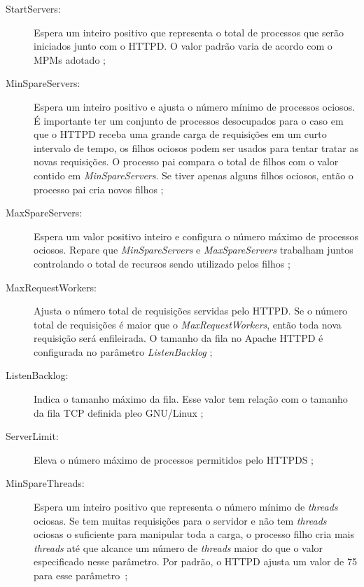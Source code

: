 \begin{description}
  \item [StartServers:]
Espera um inteiro positivo que representa o total de processos que serão
iniciados junto com o HTTPD.  O valor padrão varia de acordo com o MPMs adotado
\citep{mpm_start_server};

  \item [MinSpareServers:]
Espera um inteiro positivo e ajusta o número mínimo de processos ociosos. É
importante ter um conjunto de processos desocupados para o caso em que o HTTPD
receba uma grande carga de requisições em um curto intervalo de tempo, os
filhos ociosos podem ser usados para tentar tratar as novas requisições. O
processo pai compara o total de filhos com o valor contido em
\textit{MinSpareServers}. Se tiver apenas alguns filhos ociosos, então o
processo pai cria novos filhos \citep{mpm_min_spare};

  \item [MaxSpareServers:]
Espera um valor positivo inteiro e configura o número máximo de processos
ociosos. Repare que \textit{MinSpareServers} e \textit{MaxSpareServers}
trabalham juntos controlando o total de recursos sendo utilizado pelos filhos
\citep{mpm_max_spare};

  \item [MaxRequestWorkers:]
Ajusta o número total de requisições servidas pelo HTTPD. Se o número total de
requisições é maior que o \textit{MaxRequestWorkers}, então toda nova
requisição será enfileirada. O tamanho da fila no Apache HTTPD é configurada no
parâmetro \textit{ListenBacklog} \citep{mpm_max_request};

  \item [ListenBacklog:]
Indica o tamanho máximo da fila.  Esse valor tem relação com o
tamanho da fila TCP definida pleo GNU/Linux \citep{mpm_listen};

  \item [ServerLimit:]
Eleva o número máximo de processos permitidos pelo HTTPDS
\citep{mpm_server_limit};

  \item [MinSpareThreads:]
Espera um inteiro positivo que representa o número mínimo de \emph{threads} ociosas.
Se tem muitas requisições para o servidor e não tem \emph{threads} ociosas o
suficiente para manipular toda a carga, o processo filho cria mais \emph{threads} até
que alcance um número de \emph{threads} maior do que o valor especificado nesse
parâmetro.  Por padrão, o HTTPD ajusta um valor de 75 para esse
parâmetro~\citep{mpm_minsparethreads};


\end{description}
